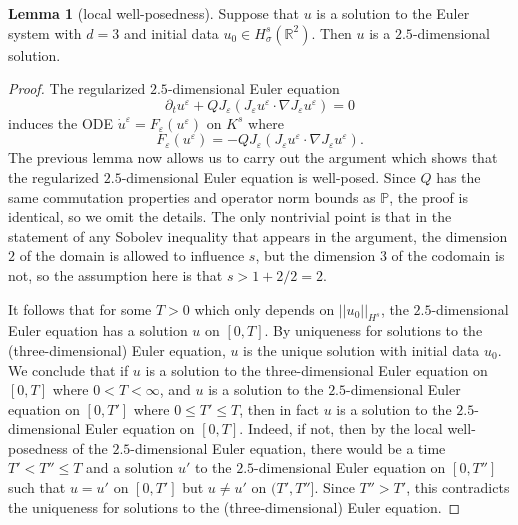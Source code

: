 \documentclass[10pt]{article}
\newcommand{\RR}{\mathbb{R}}
\newcommand{\PP}{\mathbb P}
\theoremstyle{definition}
\newtheorem{lemma}{Lemma}[exer]
\begin{document}
\begin{lemma}[local well-posedness]
Suppose that $u$ is a solution to the Euler system with $d = 3$ and initial data $u_0 \in H^s_\sigma(\RR^2)$.
Then $u$ is a $2.5$-dimensional solution.
\end{lemma}
\begin{proof}
The regularized $2.5$-dimensional Euler equation
$$\partial_t u^\varepsilon + QJ_\varepsilon(J_\varepsilon u^\varepsilon \cdot \nabla J_\varepsilon u^\varepsilon) = 0$$
induces the ODE $\dot u^\varepsilon = F_\varepsilon(u^\varepsilon)$ on $K^s$ where
$$F_\varepsilon(u^\varepsilon) = -QJ_\varepsilon(J_\varepsilon u^\varepsilon \cdot \nabla J_\varepsilon u^\varepsilon).$$
The previous lemma now allows us to carry out the argument which shows that the regularized $2.5$-dimensional Euler equation is well-posed.
Since $Q$ has the same commutation properties and operator norm bounds as $\PP$, the proof is identical, so we omit the details.
The only nontrivial point is that in the statement of any Sobolev inequality that appears in the argument, the dimension $2$ of the domain is allowed to influence $s$, but the dimension $3$ of the codomain is not, so the assumption here is that $s > 1 + 2/2 = 2$.

It follows that for some $T > 0$ which only depends on $||u_0||_{H^s}$, the $2.5$-dimensional Euler equation has a solution $u$ on $[0, T]$.
By uniqueness for solutions to the (three-dimensional) Euler equation, $u$ is the unique solution with initial data $u_0$.
We conclude that if $u$ is a solution to the three-dimensional Euler equation on $[0, T]$ where $0 < T < \infty$, and $u$ is a solution to the $2.5$-dimensional Euler equation on $[0, T']$ where $0 \leq T' \leq T$, then in fact $u$ is a solution to the $2.5$-dimensional Euler equation on $[0, T]$.
Indeed, if not, then by the local well-posedness of the $2.5$-dimensional Euler equation, there would be a time $T' < T'' \leq T$ and a solution $u'$ to the $2.5$-dimensional Euler equation on $[0, T'']$ such that $u = u'$ on $[0, T']$ but $u \neq u'$ on $(T', T'']$.
Since $T'' > T'$, this contradicts the uniqueness for solutions to the (three-dimensional) Euler equation.
\end{proof}
\end{document}
